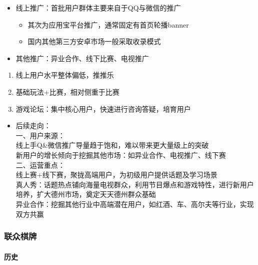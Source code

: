 \documentclass[11pt]{article}
\providecommand{\tightlist}{%
      \setlength{\itemsep}{0pt}\setlength{\parskip}{0pt}}
\begin{document}
\begin{itemize}
\tightlist
\item
  线上推广：首批用户群体主要来自于QQ与微信的推广

  \begin{itemize}
  \tightlist
  \item
    其次为应用宝平台推广，通常固定有首页轮播banner
  \item
    国内其他第三方安卓市场一般采取收录模式
  \end{itemize}
\item
  其他推广：异业合作、线下比赛、电视推广
\end{itemize}

\begin{enumerate}
\def\labelenumi{\arabic{enumi}.}
\tightlist
\item
  线上用户水平整体偏低，推推乐
\item
  基础玩法+比赛，相对侧重于比赛
\item
  游戏论坛：集中核心用户，快速进行咨询答疑，培育用户
\end{enumerate}

\begin{itemize}
\tightlist
\item
  后续走向：\\
  一、用户来源：\\
  线上手Q\&微信推广导量趋于饱和，难以带来更大量级上的突破\\
  新用户的增长倾向于挖掘其他市场：如异业合作、电视推广、线下赛\\
  二、运营重点：\\
  线上赛+线下赛，聚拢高端用户，为初级用户提供话题及学习场景\\
  真人秀：话题热点铺向海量电视群众，利用节目爆点和游戏特性，进行新用户培养，扩大德州市场，奠定天天德州群众基础\\
  异业合作：挖掘其他行业中高端潜在用户，如红酒、车、高尔夫等行业，实现双方共赢
\end{itemize}

    \hypertarget{ux8054ux4f17ux68cbux724c}{%
\subsubsection{联众棋牌}\label{ux8054ux4f17ux68cbux724c}}

\hypertarget{ux5386ux53f2}{%
\paragraph{历史}\label{ux5386ux53f2}}
\end{document}

